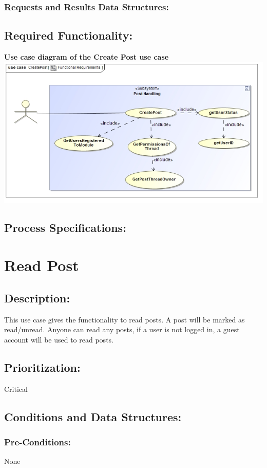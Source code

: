 \documentclass[a4paper,11pt]{article}
\begin{document}
\subsubsection*{Requests and Results Data Structures:}
\subsection{Required Functionality:} 
\textbf{Use case diagram of the Create Post use case}\\
\includegraphics[width=1\linewidth]{./Images/PostHandling/postCreation.jpg}\\
\subsection{Process Specifications:} 

\section{Read Post}
\subsection*{Description:}This use case gives the functionality to read posts. A post will be marked as read/unread. Anyone can read any posts, if a user is not logged in, a guest account will be used to read posts.
\subsection{Prioritization:} Critical
\subsection{Conditions and Data Structures:}
\subsubsection*{Pre-Conditions:}None
\end{document}
